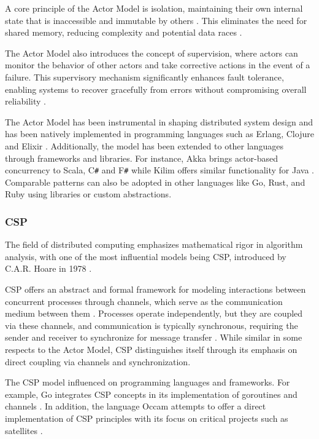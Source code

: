A core principle of the Actor Model is isolation, maintaining their own internal state that is inaccessible and immutable by others \cite{Koster2016}. This eliminates the need for shared memory, reducing complexity and potential data races \cite{Valkov2018}.

The Actor Model also introduces the concept of supervision, where actors can monitor the behavior of other actors and take corrective actions in the event of a failure. This supervisory mechanism significantly enhances fault tolerance, enabling systems to recover gracefully from errors without compromising overall reliability \cite{Trinder2017}.

The Actor Model has been instrumental in shaping distributed system design and has been natively implemented in programming languages such as Erlang, Clojure and Elixir \cite{Randtoul2022}. Additionally, the model has been extended to other languages through frameworks and libraries. For instance, Akka brings actor-based concurrency to Scala, C\texttt{\#} and F\texttt{\#} while Kilim offers similar functionality for Java \cite{Trinder2017}. Comparable patterns can also be adopted in other languages like Go, Rust, and Ruby using libraries or custom abstractions.

\subsubsection{\gls{CSP}}

The field of distributed computing emphasizes mathematical rigor in algorithm analysis, with one of the most influential models being \gls{CSP}, introduced by C.A.R. Hoare in 1978 \cite{Hoare1978}.

\gls{CSP} offers an abstract and formal framework for modeling interactions between concurrent processes through channels, which serve as the communication medium between them \cite{Paduraru2018}. Processes operate independently, but they are coupled via these channels, and communication is typically synchronous, requiring the sender and receiver to synchronize for message transfer \cite{Hoare1978}. While similar in some respects to the Actor Model, \gls{CSP} distinguishes itself through its emphasis on direct coupling via channels and synchronization.

The \gls{CSP} model influenced on programming languages and frameworks. For example, Go integrates \gls{CSP} concepts in its implementation of goroutines and channels \cite{go-docs, Valkov2018,Paduraru2018}. In addition, the language Occam attempts to offer a direct implementation of \gls{CSP} principles with its focus on critical projects such as satellites \cite{Brolos2021}.

